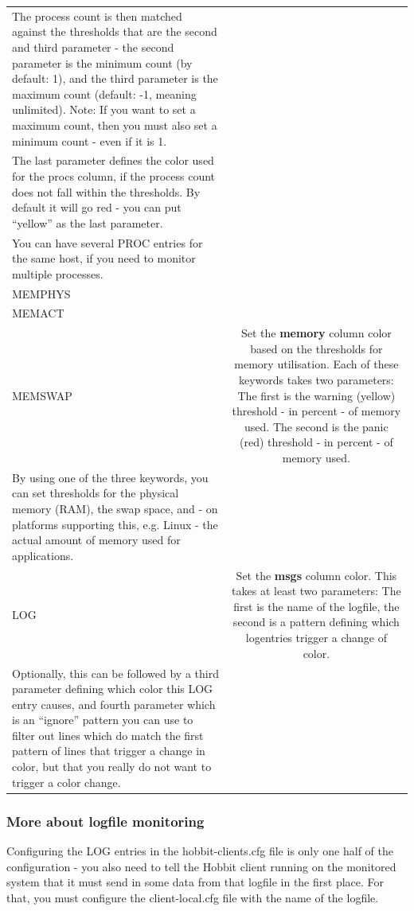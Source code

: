 \begin{tabular}{lc}
 The process count is then matched against the thresholds that are the second and third parameter - the second parameter is the minimum count (by default: 1), and the third parameter is the maximum count (default: -1, meaning unlimited). Note: If you want to set a maximum count, then you must also set a minimum count - even if it is 1.\\ 
 The last parameter defines the color used for the procs column, if the process count does not fall within the thresholds. By default it will go red - you can put ``yellow'' as the last parameter.\\ 
 You can have several PROC entries for the same host, if you need to monitor multiple processes.  \\
MEMPHYS\\ 
MEMACT\\ 
MEMSWAP &Set the \textbf{memory}
 column color based on the thresholds for memory utilisation. Each of these keywords takes two parameters: The first is the warning (yellow) threshold - in percent - of memory used. The second is the panic (red) threshold - in percent - of memory used.\\ 
 By using one of the three keywords, you can set thresholds for the physical memory (RAM), the swap space, and - on platforms supporting this, e.g. Linux - the actual amount of memory used for applications.  \\
LOG &Set the \textbf{msgs}
 column color. This takes at least two parameters: The first is the name of the logfile, the second is a pattern defining which logentries trigger a change of color.\\ 
 Optionally, this can be followed by a third parameter defining which color this LOG entry causes, and fourth parameter which is an ``ignore'' pattern you can use to filter out lines which do match the first pattern of lines that trigger a change in color, but that you really do not want to trigger a color change.\\ 


\end{tabular}

\subsubsection{More about logfile monitoring}


 Configuring the LOG entries in the hobbit-clients.cfg file is only one half of the configuration - you also need to tell the Hobbit client running on the monitored system that it must send in some data from that logfile in the first place. For that, you must configure the  client-local.cfg file with the name of the logfile.


